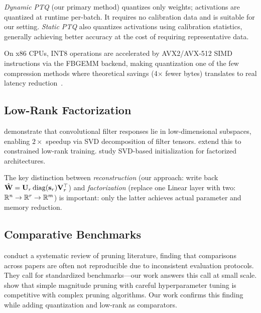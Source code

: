 \emph{Dynamic PTQ} (our primary method) quantizes only weights;
activations are quantized at runtime per-batch.
It requires no calibration data and is suitable for our setting.
\emph{Static PTQ} also quantizes activations using calibration statistics,
generally achieving better accuracy at the cost of requiring representative data.

On x86 CPUs, INT8 operations are accelerated by AVX2/AVX-512 SIMD instructions
via the FBGEMM backend, making quantization one of the few compression methods
where theoretical savings (4$\times$ fewer bytes) translates to real
latency reduction~\citep{deng2020model}.

\subsection{Low-Rank Factorization}

\citet{denton2014exploiting} demonstrate that convolutional filter responses
lie in low-dimensional subspaces, enabling $2\times$ speedup via SVD
decomposition of filter tensors.
\citet{li2018constrained} extend this to constrained low-rank training.
\citet{khodak2021initialization} study SVD-based initialization for
factorized architectures.

The key distinction between \emph{reconstruction}
(our approach: write back $\hat{\mathbf{W}} = \mathbf{U}_r \operatorname{diag}(\mathbf{s}_r) \mathbf{V}_r^\top$)
and \emph{factorization} (replace one Linear layer with two: $\mathbb{R}^n \to \mathbb{R}^r \to \mathbb{R}^m$)
is important: only the latter achieves actual parameter and memory reduction.

\subsection{Comparative Benchmarks}

\citet{blalock2020state} conduct a systematic review of pruning literature,
finding that comparisons across papers are often not reproducible due to
inconsistent evaluation protocols.
They call for standardized benchmarks—our work answers this call at
small scale.
\citet{gale2019state} show that simple magnitude pruning with careful
hyperparameter tuning is competitive with complex pruning algorithms.
Our work confirms this finding while adding quantization and low-rank as
comparators.
